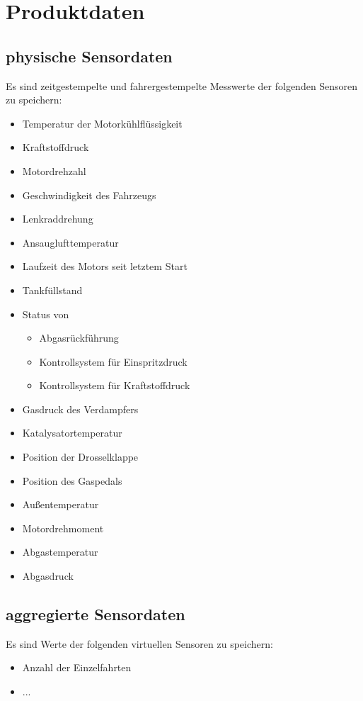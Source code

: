 \documentclass[pflichtenheft.tex]{subfiles}
\begin{document}
\chapter{Produktdaten}

\section{\mkd physische Sensordaten}
Es sind zeitgestempelte und fahrergestempelte Messwerte der folgenden Sensoren zu speichern:
\begin{itemize}
\item
Temperatur der Motorkühlflüssigkeit
\item
Kraftstoffdruck
\item
Motordrehzahl
\item
Geschwindigkeit des Fahrzeugs
\item
Lenkraddrehung
\item
Ansauglufttemperatur 
\item
Laufzeit des Motors seit letztem Start
\item
Tankfüllstand
\item
Status von
\begin{itemize}
\item Abgasrückführung
\item Kontrollsystem für Einspritzdruck
\item Kontrollsystem für Kraftstoffdruck
\end{itemize}
\item
Gasdruck des Verdampfers
\item
Katalysatortemperatur
\item
Position der Drosselklappe
\item
Position des Gaspedals
\item
Außentemperatur
\item
Motordrehmoment
\item
Abgastemperatur
\item
Abgasdruck


\end{itemize}

\section{\mkd aggregierte Sensordaten}
Es sind Werte der folgenden virtuellen Sensoren zu speichern:
\begin{itemize}
\item
Anzahl der Einzelfahrten
\item
...

\end{itemize}
\end{document}

